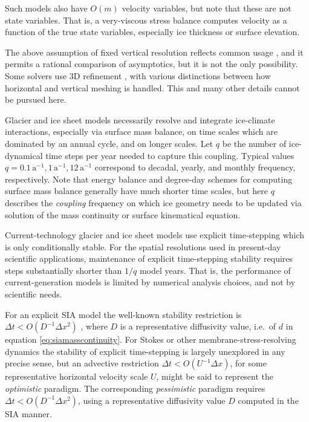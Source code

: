 \documentclass[review,letterpaper]{igs}
\begin{document}
Such models also have $O(m)$ velocity variables, but note that these are not state variables.  That is, a very-viscous stress balance computes velocity as a function of the true state variables, especially ice thickness or surface elevation.

The above assumption of fixed vertical resolution reflects common usage \citep[for example]{Aschwandenetal2019,BrinkerhoffJohnson2015,Hoffmanetal2018,Lengetal2012,
Winkelmannetal2011}, and it permits a rational comparison of asymptotics, but it is not the only possibility.  Some solvers use 3D refinement \citep{BrownSmithAhmadia2013,IsaacStadlerGhattas2015,Tuminaroetal2016}, with various distinctions between how horizontal and vertical meshing is handled.  This and many other details cannot be pursued here.

Glacier and ice sheet models necessarily resolve and integrate ice-climate interactions, especially via surface mass balance, on time scales which are dominated by an annual cycle, and on longer scales.  Let $q$ be the number of ice-dynamical time steps per year needed to capture this coupling.  Typical values $q=0.1 \,\text{a}^{-1}, 1 \,\text{a}^{-1}, 12 \,\text{a}^{-1}$ correspond to decadal, yearly, and monthly frequency, respectively.  Note that energy balance and degree-day schemes for computing surface mass balance generally have much shorter time scales, but here $q$ describes the \emph{coupling} frequency on which ice geometry needs to be updated via solution of the mass continuity or surface kinematical equation.

Current-technology glacier and ice sheet models use explicit time-stepping which is only conditionally stable.  For the spatial resolutions used in present-day scientific applications, maintenance of explicit time-stepping stability requires steps substantially shorter than $1/q$ model years.  That is, the performance of current-generation models is limited by numerical analysis choices, and not by scientific needs.

For an explicit SIA model the well-known stability restriction is $\Delta t < O(D^{-1} \Delta x^2)$ \citep{Bueleretal2005,HindmarshPayne1996}, where $D$ is a representative diffusivity value, i.e.~of $d$ in equation \eqref{eq:siamasscontinuity}.  For Stokes or other membrane-stress-resolving dynamics the stability of explicit time-stepping is largely unexplored in any precise sense, but an advective restriction $\Delta t < O(U^{-1} \Delta x)$, for some representative horizontal velocity scale $U$, might be said to represent the \emph{optimistic} paradigm.  The corresponding \emph{pessimistic} paradigm requires $\Delta t < O(D^{-1} \Delta x^2)$, using a representative diffusivity value $D$ computed in the SIA manner.
\end{document}

